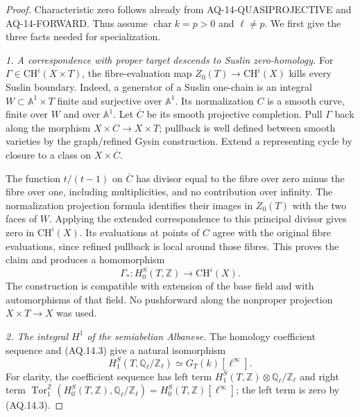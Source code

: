 \documentclass[11pt,a4paper]{article}
\theoremstyle{definition}\newtheorem{definition}[theorem]{Definition}
\theoremstyle{remark}\newtheorem{remark}[theorem]{Remark}
\begin{document}
\begin{proof}
Characteristic zero follows already from
AQ-14-QUASIPROJECTIVE and AQ-14-FORWARD. Thus assume
$\operatorname{char}k=p>0$ and $\ell\ne p$.
We first give the three facts needed for specialization.

\emph{1. A correspondence with proper target descends to
Suslin zero-homology.}
For $\Gamma\in\mathrm{CH}^i(X\times T)$, the fibre-evaluation
map $Z_0(T)\to\mathrm{CH}^i(X)$ kills every Suslin boundary.
Indeed, a generator of a Suslin one-chain is an integral
$W\subset\mathbb A^1\times T$ finite and surjective over
$\mathbb A^1$. Its normalization $C$ is a smooth curve,
finite over $W$ and over $\mathbb A^1$. Let $\overline C$
be its smooth projective completion. Pull $\Gamma$ back
along the morphism $X\times C\to X\times T$; pullback is
well defined between smooth varieties by the graph/refined
Gysin construction. Extend a representing cycle by closure
to a class on $X\times\overline C$.

The function $t/(t-1)$ on $\overline C$ has divisor equal
to the fibre over zero minus the fibre over one, including
multiplicities, and no contribution over infinity. The
normalization projection formula identifies their images
in $Z_0(T)$ with the two faces of $W$. Applying the extended
correspondence to this principal divisor gives zero in
$\mathrm{CH}^i(X)$. Its evaluations at points of $C$ agree
with the original fibre evaluations, since refined pullback
is local around those fibres. This proves the claim and
produces a homomorphism
\[
 \Gamma_*:H_0^S(T,\mathbb Z)\longrightarrow\mathrm{CH}^i(X).
                                                               \tag{AQ.14.4}
\]
The construction is compatible with extension of the base
field and with automorphisms of that field. No pushforward
along the nonproper projection $X\times T\to X$ was used.

\emph{2. The integral $H^1$ of the semiabelian Albanese.}
The homology coefficient sequence and (AQ.14.3) give a
natural isomorphism
\[
 H_1^S(T,\mathbb Q_\ell/\mathbb Z_\ell)
             \simeq G_T(k)[\ell^\infty].                    \tag{AQ.14.5}
\]
For clarity, the coefficient sequence has left term
$H_1^S(T,\mathbb Z)\otimes\mathbb Q_\ell/\mathbb Z_\ell$
and right term
$\operatorname{Tor}_1^{\mathbb Z}(H_0^S(T,\mathbb Z),
\mathbb Q_\ell/\mathbb Z_\ell)=H_0^S(T,\mathbb Z)[\ell^\infty]$;
the left term is zero by (AQ.14.3).


\end{proof}
\end{document}
